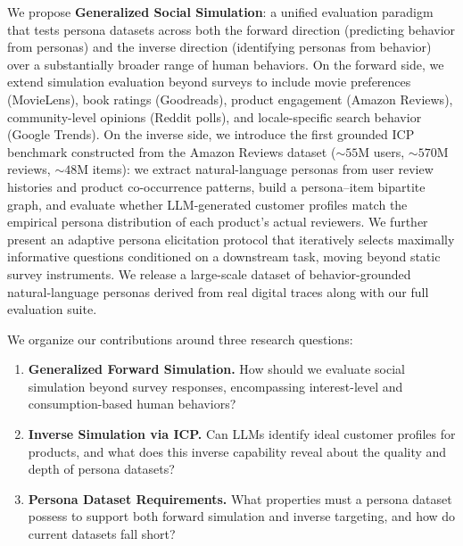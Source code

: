 We propose \textbf{Generalized Social Simulation}: a unified evaluation paradigm that tests persona datasets across both the forward direction (predicting behavior from personas) and the inverse direction (identifying personas from behavior) over a substantially broader range of human behaviors.
On the forward side, we extend simulation evaluation beyond surveys to include movie preferences (MovieLens), book ratings (Goodreads), product engagement (Amazon Reviews), community-level opinions (Reddit polls), and locale-specific search behavior (Google Trends).
On the inverse side, we introduce the first grounded ICP benchmark constructed from the Amazon Reviews dataset (${\sim}55$M users, ${\sim}570$M reviews, ${\sim}48$M items): we extract natural-language personas from user review histories and product co-occurrence patterns, build a persona--item bipartite graph, and evaluate whether LLM-generated customer profiles match the empirical persona distribution of each product's actual reviewers.
We further present an adaptive persona elicitation protocol that iteratively selects maximally informative questions conditioned on a downstream task, moving beyond static survey instruments.
We release a large-scale dataset of behavior-grounded natural-language personas derived from real digital traces along with our full evaluation suite.

\medskip
\noindent We organize our contributions around three research questions:
\begin{enumerate}
    \item[\textbf{RQ1.}] \textbf{Generalized Forward Simulation.} How should we evaluate social simulation beyond survey responses, encompassing interest-level and consumption-based human behaviors?
    \item[\textbf{RQ2.}] \textbf{Inverse Simulation via ICP.} Can LLMs identify ideal customer profiles for products, and what does this inverse capability reveal about the quality and depth of persona datasets?
    \item[\textbf{RQ3.}] \textbf{Persona Dataset Requirements.} What properties must a persona dataset possess to support both forward simulation and inverse targeting, and how do current datasets fall short?
\end{enumerate}

